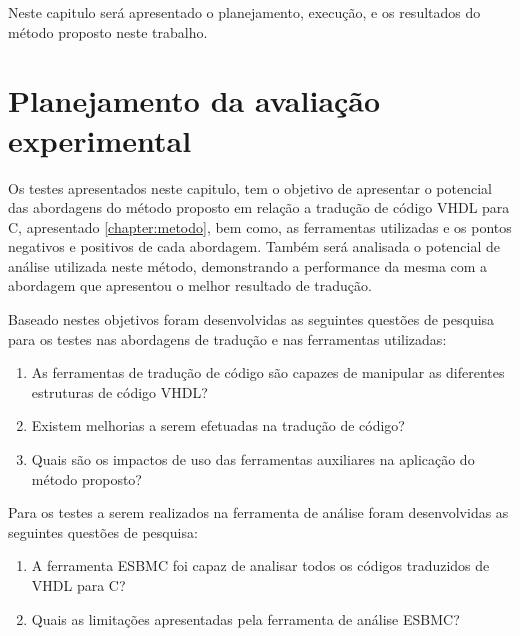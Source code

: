 \label{chapter:resultados}
\par
Neste capitulo será apresentado o planejamento, execução, e os resultados do método proposto neste trabalho.

\section{Planejamento da avaliação experimental}

\par 
Os testes apresentados neste capitulo, tem o objetivo de apresentar o potencial das abordagens do método proposto em relação a tradução de código VHDL para C, apresentado \autoref{chapter:metodo}, bem como, as ferramentas utilizadas e os pontos negativos e positivos de cada abordagem. Também será analisada o potencial de análise utilizada neste método, demonstrando a performance da mesma com a abordagem que apresentou o melhor resultado de tradução. 



\par 
Baseado nestes objetivos foram desenvolvidas as seguintes questões de pesquisa para os testes nas abordagens de tradução e nas ferramentas utilizadas: 
\begin{enumerate} 
    \item As ferramentas de tradução de código são capazes de manipular as diferentes estruturas de código VHDL? 
    \item Existem melhorias a serem efetuadas na tradução de código?
    \item Quais são os impactos de uso das ferramentas auxiliares na aplicação do método proposto? 
\end{enumerate} 

\par 
Para os testes a serem realizados na ferramenta de análise foram desenvolvidas as seguintes questões de pesquisa: 
\begin{enumerate} 
    \item A ferramenta ESBMC foi capaz de analisar todos os códigos traduzidos de VHDL para C? 
    \item Quais as limitações apresentadas pela ferramenta de análise ESBMC? 
\end{enumerate} 

